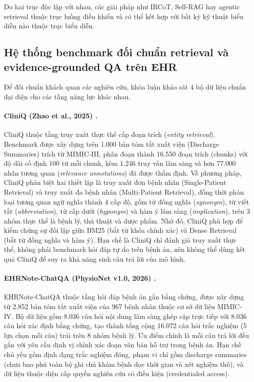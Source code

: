 Do hai trục độc lập với nhau, các giải pháp như IRCoT, Self-RAG hay agentic retrieval thuộc trục luồng điều khiển và có thể kết hợp với bất kỳ kỹ thuật biểu diễn nào thuộc trục biểu diễn.

\subsection{Hệ thống benchmark đối chuẩn retrieval và evidence-grounded QA trên EHR}

Để đối chuẩn khách quan các nghiên cứu, khóa luận khảo sát 4 bộ dữ liệu chuẩn đại diện cho các tầng năng lực khác nhau.

\paragraph{CliniQ (Zhao et al., 2025) \cite{cliniq2025}.}
CliniQ thuộc tầng truy xuất thực thể cấp đoạn trích (\emph{entity retrieval}). Benchmark được xây dựng trên 1.000 bản tóm tắt xuất viện (Discharge Summaries) trích từ MIMIC-III, phân đoạn thành 16.550 đoạn trích (chunks) với độ dài cố định 100 từ mỗi chunk, kèm 1.246 truy vấn lâm sàng và hơn 77.000 nhãn tương quan (\emph{relevance annotations}) đã được thẩm định. Về phương pháp, CliniQ phân biệt hai thiết lập là truy xuất đơn bệnh nhân (Single-Patient Retrieval) và truy xuất đa bệnh nhân (Multi-Patient Retrieval), đồng thời phân loại tương quan ngữ nghĩa thành 4 cấp độ, gồm từ đồng nghĩa (\emph{synonym}), từ viết tắt (\emph{abbreviation}), từ cấp dưới (\emph{hyponym}) và hàm ý lâm sàng (\emph{implication}), trên 3 nhóm thực thể là bệnh lý, thủ thuật và dược phẩm. Nhờ đó, CliniQ phù hợp để kiểm chứng sự đối lập giữa BM25 (bắt từ khóa chính xác) và Dense Retrieval (bắt từ đồng nghĩa và hàm ý). Hạn chế là CliniQ chỉ đánh giá truy xuất thực thể, không phải benchmark hỏi đáp tự do trên bệnh án, nên không thể dùng kết quả CliniQ để suy ra khả năng sinh câu trả lời của mô hình.

\paragraph{EHRNote-ChatQA (PhysioNet v1.0, 2026) \cite{ehrnote_chatqa2026}.}
EHRNote-ChatQA thuộc tầng hỏi đáp bệnh án gắn bằng chứng, được xây dựng từ 2.852 bản tóm tắt xuất viện của 967 bệnh nhân thuộc cơ sở dữ liệu MIMIC-IV. Bộ dữ liệu gồm 8.036 câu hỏi nội dung lâm sàng ghép cặp trực tiếp với 8.036 câu hỏi xác định bằng chứng, tạo thành tổng cộng 16.072 câu hỏi trắc nghiệm (5 lựa chọn mỗi câu) trải trên 8 nhóm bệnh lý. Ưu điểm chính là mỗi câu trả lời đều gắn với yêu cầu định vị chính xác đoạn văn bản hỗ trợ trong bệnh án. Hạn chế chủ yếu gồm định dạng trắc nghiệm đóng, phạm vi chỉ gồm discharge summaries (chưa bao phủ toàn bộ ghi chú khám bệnh dọc thời gian và xét nghiệm thô), và dữ liệu thuộc diện cấp quyền nghiên cứu có điều kiện (credentialed access).

